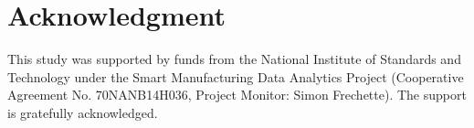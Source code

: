 \section*{Acknowledgment}

This study was supported by funds from the National Institute of Standards 
and Technology under the Smart Manufacturing Data Analytics Project 
(Cooperative Agreement No. 70NANB14H036, Project Monitor: Simon Frechette).
The support is gratefully acknowledged.
